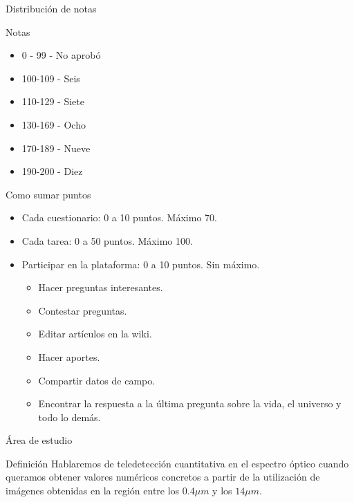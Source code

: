 \documentclass[]{article}
\begin{document}
\begin{frame}{Distribución de notas}
    \begin{block}{Notas}
        \begin{itemize}[<+->]
        \item 0 - 99 - No aprobó
        \item 100-109 - Seis
        \item 110-129 - Siete
        \item 130-169 - Ocho
        \item 170-189 - Nueve
        \item 190-200 - Diez
      \end{itemize}
    \end{block}
\end{frame}

\begin{frame}{Como sumar puntos}
  \begin{itemize}[<+->]
    \item Cada cuestionario: 0 a 10 puntos. Máximo 70.
    \item Cada tarea: 0 a 50 puntos. Máximo 100.
    \item Participar en la plataforma: 0 a 10 puntos. Sin máximo.
    \begin{itemize}
      \item Hacer preguntas interesantes.
      \item Contestar preguntas.
      \item Editar artículos en la wiki.
      \item Hacer aportes.
      \item Compartir datos de campo.
      \item Encontrar la respuesta a la última pregunta sobre la vida, el universo y todo lo demás.
    \end{itemize}
  \end{itemize}
\end{frame}

\begin{frame}{Área de estudio}
  \begin{block}{Definición}
    Hablaremos de teledetección cuantitativa en el espectro óptico cuando queramos obtener valores numéricos concretos a partir de la utilización de imágenes obtenidas en la región entre los $0.4\mu m$ y los $14\mu m$.
  \end{block}
\end{frame}
\end{document}
